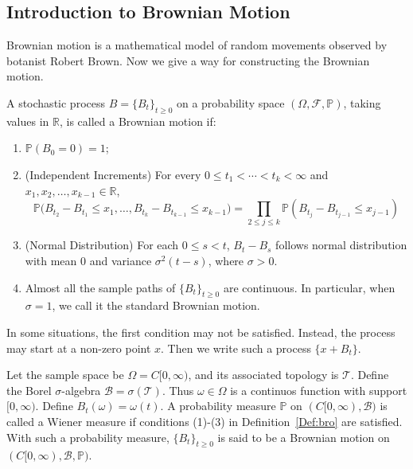 \subsection{Introduction to Brownian Motion}


Brownian motion is a mathematical model of random movements observed by botanist Robert Brown.
Now we give a way for constructing the Brownian motion.

\begin{definition}\label{Def:bro}
A stochastic process $B = \{B_t\}_{t\ge0}$ on a probability space 
$(\Omega,\mathcal{F},\mathbb{P})$,
taking values in $\mathbb{R}$,
is called a Brownian motion if:
\begin{enumerate}
\item
$\mathbb{P}(B_0=0)=1$;
\item
(Independent Increments)
For every $0\le t_1<\cdots<t_k<\infty$ and $x_1,x_2,\ldots,x_{k-1}\in\mathbb{R}$,
\[
\mathbb{P}\bigg(
B_{t_2}-B_{t_1}\le x_1,
\ldots,
B_{t_k}-B_{t_{k-1}}\le x_{k-1}
\bigg)
=
\prod_{2\le j\le k}
\mathbb{P}(
B_{t_j}-B_{t_{j-1}}\le x_{j-1}
)
\]
\item
(Normal Distribution)%
For each $0\le s<t$, $B_t-B_s$ follows normal distribution with mean $0$ and variance $\sigma^2(t-s)$, where $\sigma>0$.
\item
Almost all the sample paths of $\{B_t\}_{t\ge0}$ are continuous.
In particular, when $\sigma=1$, we call it the standard Brownian motion.
\end{enumerate}
\end{definition}

\begin{remark}
In some situations, the first condition may not be satisfied. Instead, the process may start at a non-zero point $x$. Then we write such a process $\{x+B_t\}$.
\end{remark}

\begin{definition}\label{Def:Wie}
Let the sample space be $\Omega=C[0,\infty)$, and its associated topology is $\mathcal{T}$.
Define the Borel $\sigma$-algebra $\mathcal{B}=\sigma(\mathcal{T})$.
Thus $\omega\in\Omega$ is a continuos function with support $[0,\infty)$.
Define $B_t(\omega)=\omega(t)$.
A probability measure $\mathbb{P}$ on $(C[0,\infty),\mathcal{B})$ is called
a Wiener measure if conditions (1)-(3) in Definition~\ref{Def:bro} are satisfied.
With such a probability measure, 
$\{B_t\}_{t\ge0}$ is said to be a Brownian motion on $(C[0,\infty),\mathcal{B},\mathbb{P})$.
\end{definition}

